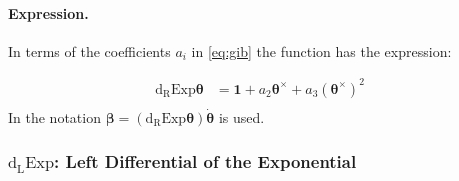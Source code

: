 \paragraph*{Expression.}

In terms of the coefficients \(a_i\) in \eqref{eq:gib}
the function has the expression:

\begin{equation}
\begin{aligned}
\operatorname{d_{\scriptscriptstyle{R}}Exp} {\bm{\theta}}
 &=\mathbf{1}+a_2 \bm{\theta}^{\times} + a_3 \left(\bm{\theta}^{\times}\right)^2 \\
\end{aligned}
\label{eq:drExpSO3}
\end{equation}
In \cite{simo1986threedimensional} the notation \(\bm{\beta}=\left(
\operatorname{d_{\scriptscriptstyle{R}}Exp} {\bm{\theta}}
\right)
\dot{\bm{\theta}}\) is used.

\hypertarget{dlExpSO3}{%
\subsubsection{\texorpdfstring{\(\operatorname{d_{\scriptscriptstyle{L}}Exp}\):
Left Differential of the
Exponential}{dlExp: Left Differential of the Exponential}}\label{sec:dlExpSO3}}




